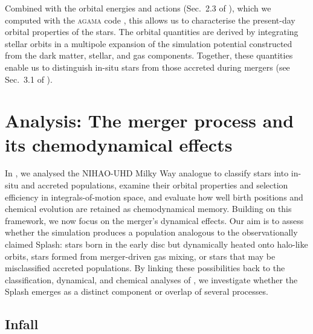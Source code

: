 \documentclass[fleqn,usenatbib]{mnras}
\begin{document}
Combined with the orbital energies and actions (Sec.~2.3 of ), which we computed with the \textsc{agama} code \citep{Vasiliev2019b}, this allows us to characterise the present-day orbital properties of the stars. The orbital quantities are derived by integrating stellar orbits in a multipole expansion of the simulation potential constructed from the dark matter, stellar, and gas components. Together, these quantities enable us to distinguish in-situ stars from those accreted during mergers (see Sec.~3.1 of ).

\section{Analysis: The merger process and its chemodynamical effects} \label{sec:analysis}


In , we analysed the NIHAO-UHD Milky Way analogue to classify stars into in-situ and accreted populations, examine their orbital properties and selection efficiency in integrals-of-motion space, and evaluate how well birth positions and chemical evolution are retained as chemodynamical memory. Building on this framework, we now focus on the merger's dynamical effects. Our aim is to assess whether the simulation produces a population analogous to the observationally claimed Splash: stars born in the early disc but dynamically heated onto halo-like orbits, stars formed from merger-driven gas mixing, or stars that may be misclassified accreted populations. By linking these possibilities back to the classification, dynamical, and chemical analyses of , we investigate whether the Splash emerges as a distinct component or overlap of several processes.

\subsection{Infall} \label{sec:analysis_infall}
\end{document}
